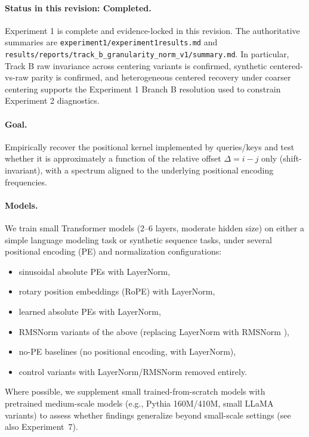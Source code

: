 \documentclass[11pt]{article}
\theoremstyle{definition}
\begin{document}
\paragraph{Status in this revision: \textbf{Completed}.}
Experiment 1 is complete and evidence-locked in this revision. The authoritative summaries are \texttt{experiment1/experiment1results.md} and \texttt{results/reports/track\_b\_granularity\_norm\_v1/summary.md}. In particular, Track B raw invariance across centering variants is confirmed, synthetic centered-vs-raw parity is confirmed, and heterogeneous centered recovery under coarser centering supports the Experiment 1 Branch B resolution used to constrain Experiment 2 diagnostics.

\paragraph{Goal.}
Empirically recover the positional kernel implemented by queries/keys and test whether it is approximately a function of the relative offset \(\Delta = i - j\) only (shift-invariant), with a spectrum aligned to the underlying positional encoding frequencies.

\paragraph{Models.}
We train small Transformer models (2--6 layers, moderate hidden size) on either a simple language modeling task or synthetic sequence tasks, under several positional encoding (PE) and normalization configurations:
\begin{itemize}
    \item sinusoidal absolute PEs with LayerNorm,
    \item rotary position embeddings (RoPE) with LayerNorm,
    \item learned absolute PEs with LayerNorm,
    \item RMSNorm variants of the above (replacing LayerNorm with RMSNorm \cite{zhang2019rmsnorm}),
    \item no-PE baselines (no positional encoding, with LayerNorm),
    \item control variants with LayerNorm/RMSNorm removed entirely.
\end{itemize}
Where possible, we supplement small trained-from-scratch models with pretrained medium-scale models (e.g., Pythia 160M/410M, small LLaMA variants) to assess whether findings generalize beyond small-scale settings (see also Experiment~7).
\end{document}
